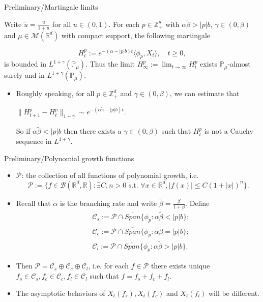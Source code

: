 \documentclass[xcolor=dvipsnames]{beamer}
\begin{document}
\begin{frame}{Preliminary/Martingale limits}
  \begin{lemma}
    Write $\tilde u = \frac{u}{1+ u}$ for all $u \in (0,1)$.
    For each $p\in \mathbb Z_+^d$ with $\alpha \tilde \beta > |p|b$, $\gamma \in (0,\beta)$ and $\mu \in \mathcal M(\mathbb R^d)$ with compact support, the following martingale
    
    \[  
      H_t^p
      := e^{-(\alpha-|p|b) t} \langle \phi_p, X_t\rangle
      , \quad t\geq 0,
    \]
    is bounded in $L^{1+\gamma}(\mathbb P_\mu)$. 
    Thus the limit $H_\infty^p:= \lim_{t\to \infty} H_t^p$ exists $\mathbb P_\mu$-almost surely and in $L^{1+\gamma}(\mathbb P_\mu)$.
  \end{lemma}
  \begin{itemize}
\item
  Roughly speaking, for all $p \in \mathbb Z_+^d$ and $\gamma \in (0,\beta)$, we can estimate that
  
  \centerline{ \( \displaystyle
    \|H_{t+1}^p - H_t^p\|_{1+\gamma} 
    \sim e^{- (\alpha\tilde\gamma - |p|b)t}.
    \)}
  So if $\alpha \tilde \beta < |p| b$ then there exists a $\gamma \in (0,\beta)$ such that $H_t^p$ is not a Cauchy sequence in $L^{1+\gamma}$. 
\end{itemize}
\end{frame}

\begin{frame}{Preliminary/Polynomial growth functions}
\begin{itemize}
\item
  $\mathcal P$: the collection of all functions of polynomial growth, i.e.
  \[
    \mathcal P 
    := \{f \in \mathcal B(\mathbb R^d, \mathbb R) : \exists C, n > 0 \text{ s.t. } \forall x\in \mathbb R^d, |f(x)|\leq C(1+|x|)^n\}.
  \]
\item
  Recall that $\alpha$ is the branching rate and write $\tilde \beta = \frac{\beta}{1+\beta}$. Define
\begin{align}  
    &\mathcal{C}_s
    :=\mathcal P \cap \overline{Span}\{\phi_p: \alpha \tilde\beta < |p|b \}; \\
    &\mathcal{C}_c
    :=\mathcal P\cap\overline{Span}\{\phi_p: \alpha \tilde\beta=|p|b \}; \\
    &\mathcal{C}_l
    :=\mathcal P\cap \overline{Span}\{\phi_p: \alpha \tilde \beta >|p|b \}. 
\end{align}
\item
  Then $\mathcal P = \mathcal C_s \oplus \mathcal C_c \oplus \mathcal C_l$, i.e. for each $f\in \mathcal P$ there exists unique $f_s\in \mathcal C_s, f_c\in \mathcal C_c, f_l\in \mathcal C_l$ such that 
  \( \displaystyle
  f = f_s+f_c+f_l.
  \) 
\item
  The asymptotic behaviors of $X_t(f_s), X_t(f_c)$ and $X_t(f_l)$ will be different. 
\end{itemize}
\end{frame}
\end{document}

